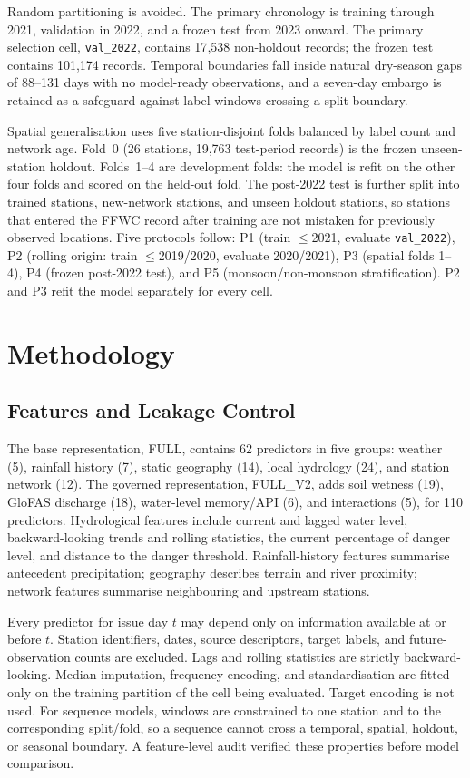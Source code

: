 \documentclass[conference]{IEEEtran}
\begin{document}
Random partitioning is avoided. The primary chronology is training through 2021, validation in 2022, and a frozen test from 2023 onward. The primary selection cell, \texttt{val\_2022}, contains 17{,}538 non-holdout records; the frozen test contains 101{,}174 records. Temporal boundaries fall inside natural dry-season gaps of 88--131 days with no model-ready observations, and a seven-day embargo is retained as a safeguard against label windows crossing a split boundary.

Spatial generalisation uses five station-disjoint folds balanced by label count and network age. Fold~0 (26 stations, 19{,}763 test-period records) is the frozen unseen-station holdout. Folds~1--4 are development folds: the model is refit on the other four folds and scored on the held-out fold. The post-2022 test is further split into trained stations, new-network stations, and unseen holdout stations, so stations that entered the FFWC record after training are not mistaken for previously observed locations. Five protocols follow: P1 (train $\leq$2021, evaluate \texttt{val\_2022}), P2 (rolling origin: train $\leq$2019/2020, evaluate 2020/2021), P3 (spatial folds 1--4), P4 (frozen post-2022 test), and P5 (monsoon/non-monsoon stratification). P2 and P3 refit the model separately for every cell.

\section{Methodology}

\subsection{Features and Leakage Control}

The base representation, FULL, contains 62 predictors in five groups: weather (5), rainfall history (7), static geography (14), local hydrology (24), and station network (12). The governed representation, FULL\_V2, adds soil wetness (19), GloFAS discharge (18), water-level memory/API (6), and interactions (5), for 110 predictors. Hydrological features include current and lagged water level, backward-looking trends and rolling statistics, the current percentage of danger level, and distance to the danger threshold. Rainfall-history features summarise antecedent precipitation; geography describes terrain and river proximity; network features summarise neighbouring and upstream stations.

Every predictor for issue day $t$ may depend only on information available at or before $t$. Station identifiers, dates, source descriptors, target labels, and future-observation counts are excluded. Lags and rolling statistics are strictly backward-looking. Median imputation, frequency encoding, and standardisation are fitted only on the training partition of the cell being evaluated. Target encoding is not used. For sequence models, windows are constrained to one station and to the corresponding split/fold, so a sequence cannot cross a temporal, spatial, holdout, or seasonal boundary. A feature-level audit verified these properties before model comparison.
\end{document}
